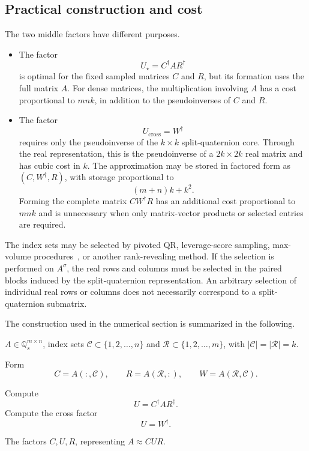 \documentclass[12pt,a4paper]{article}
\theoremstyle{plain}
\theoremstyle{definition}
\theoremstyle{remark}
\begin{document}
\subsection{Practical construction and cost}

The two middle factors have different purposes.
\begin{itemize}
\item The factor
\[
    U_\star=C^\dagger A R^\dagger
\]
is optimal for the fixed sampled matrices \(C\) and \(R\), but its formation uses the full matrix \(A\).  For dense matrices, the multiplication involving \(A\) has a cost proportional to \(mnk\), in addition to the pseudoinverses of \(C\) and \(R\).

\item The factor
\[
    U_{\mathrm{cross}}=W^\dagger
\]
requires only the pseudoinverse of the \(k\times k\) split-quaternion core. Through the real representation, this is the pseudoinverse of a \(2k\times2k\) real matrix and has cubic cost in \(k\).  The approximation may be stored in factored form as \((C,W^\dagger,R)\), with storage proportional to
\[
    (m+n)k+k^2.
\]
Forming the complete matrix \(CW^\dagger R\) has an additional cost proportional to \(mnk\) and is unnecessary when only matrix-vector products or selected entries are required.
\end{itemize}

The index sets may be selected by pivoted QR, leverage-score sampling, max-volume procedures~\cite{goreinov1997pseudo,allen2024maximal,kliushev2026quaternionmaximumvolumesubmatrixselection}, or another rank-revealing method.  If the selection is performed on \(A^\sigma\), the real rows and columns must be selected in the paired blocks induced by the split-quaternion representation.  An arbitrary selection of individual real rows or columns does not necessarily correspond to a split-quaternion submatrix.

The construction used in the numerical section is summarized in the following.

\begin{algorithm}[H]
\caption{Cross and CUR approximation of a split-quaternion matrix}
\label{alg:split-cur}
\begin{algorithmic}[1]
\REQUIRE
\(A\in\mathbb{Q}_s^{m\times n}\), index sets \(\mathcal C\subset\{1,2,\ldots,n\}\) and \(\mathcal R\subset\{1,2,\ldots,m\}\), with \(|\mathcal C|=|\mathcal R|=k\).

\STATE Form
\[
    C=A(:,\mathcal C), \qquad R=A(\mathcal R,:), \qquad W=A(\mathcal R,\mathcal C).
\]

    \STATE Compute
    \[
    U=C^\dagger A R^\dagger.
    \]
\ELSE
    \STATE Compute the cross factor
    \[
    U=W^\dagger.
    \]
\ENDIF

\RETURN The factors \(C,U,R\), representing \(A\approx CUR\).
\end{algorithmic}
\end{algorithm}
\end{document}
